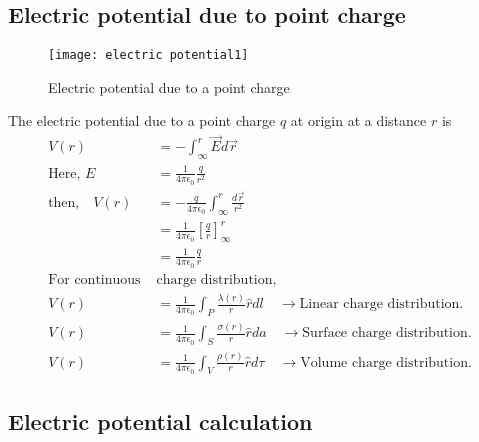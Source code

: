 \subsection{Electric potential due to point charge}
\begin{wrapfigure}{r}{0.40\textwidth}
	\begin{center}
		\texttt{[image: electric potential1]}
	\end{center}
	\caption{Electric potential due to a point charge}
\end{wrapfigure}
The electric potential due to a point charge $q$ at origin at a distance $r$ is
\begin{align*}
V(r)&=-\int_{\infty}^{r} \vec{E} d \vec{r}\\
\text{Here, }E&=\frac{1}{4\pi \epsilon_{0}}\frac{q}{r^{2}}\\
\text{then,}\quad  V(r)&=- \frac{q}{4\pi \epsilon_{0}}\int_{\infty}^{r} 
\frac{ d \vec{r}}{r^{2}}\\
&=\frac{1}{4\pi \epsilon_{0}}\left[ \frac{q}{r} \right]_{\infty}^{r}\\
&=\frac{1}{4\pi \epsilon_{0}} \frac{q}{r} \\
\text{For continuous }&\text{charge distribution,}\\
{V}({r})&=\frac{1}{4 \pi \epsilon_{0}} \int_{{P}} \frac{\lambda\left({r}\right)}{r} \hat{{r}} d l\quad\rightarrow \text{Linear charge distribution.}\\
{V}({r})&=\frac{1}{4 \pi \epsilon_{0}} \int_{{S}} \frac{\sigma\left({r}\right)}{r} \hat{{r}} d a\quad\rightarrow \text{Surface charge distribution.}\\
{V}({r})&=\frac{1}{4 \pi \epsilon_{0}} \int_{{V}} \frac{\rho\left({r}\right)}{r} \hat{r} d \tau\quad \rightarrow \text{Volume charge distribution.}
\end{align*}



\subsection{Electric potential calculation}

